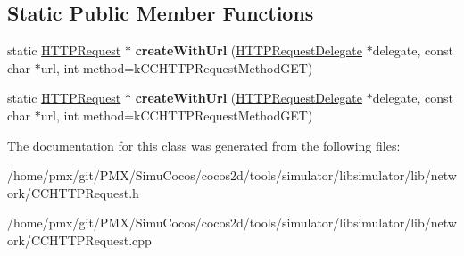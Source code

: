 \subsection*{Static Public Member Functions}
\begin{DoxyCompactItemize}
\item 
\mbox{\label{classHTTPRequest_a22daec6a23a76dd613f85425f9eb153a}} 
static \hyperlink{classHTTPRequest}{H\+T\+T\+P\+Request} $\ast$ {\bfseries create\+With\+Url} (\hyperlink{classHTTPRequestDelegate}{H\+T\+T\+P\+Request\+Delegate} $\ast$delegate, const char $\ast$url, int method=k\+C\+C\+H\+T\+T\+P\+Request\+Method\+G\+ET)
\item 
\mbox{\label{classHTTPRequest_a2edae681ad9eb3afdecc1c4cc660a332}} 
static \hyperlink{classHTTPRequest}{H\+T\+T\+P\+Request} $\ast$ {\bfseries create\+With\+Url} (\hyperlink{classHTTPRequestDelegate}{H\+T\+T\+P\+Request\+Delegate} $\ast$delegate, const char $\ast$url, int method=k\+C\+C\+H\+T\+T\+P\+Request\+Method\+G\+ET)
\end{DoxyCompactItemize}


The documentation for this class was generated from the following files\+:\begin{DoxyCompactItemize}
\item 
/home/pmx/git/\+P\+M\+X/\+Simu\+Cocos/cocos2d/tools/simulator/libsimulator/lib/network/C\+C\+H\+T\+T\+P\+Request.\+h\item 
/home/pmx/git/\+P\+M\+X/\+Simu\+Cocos/cocos2d/tools/simulator/libsimulator/lib/network/C\+C\+H\+T\+T\+P\+Request.\+cpp\end{DoxyCompactItemize}
